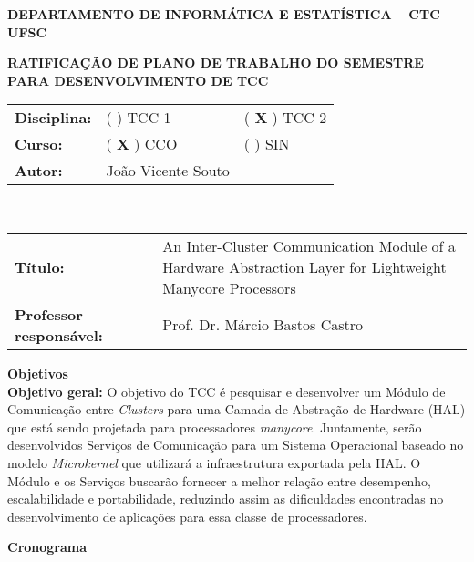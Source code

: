 \documentclass[12pt]{article}
\begin{document}
	\pagestyle{empty}

	\begin{centering}

		\textbf{DEPARTAMENTO DE INFORMÁTICA E ESTATÍSTICA -- CTC -- UFSC}

		\textbf{RATIFICAÇÃO DE PLANO DE TRABALHO DO SEMESTRE \\ PARA DESENVOLVIMENTO DE TCC}

	\end{centering}

	\vspace{1em}
	\setlength\extrarowheight{5pt}
	\begin{tabular}{l l l}
		\textbf{Disciplina:} & ( ) TCC 1          & ( \textbf{X} ) TCC 2 \\
		\textbf{Curso:}      & ( \textbf{X} ) CCO & ( ) SIN              \\
		\textbf{Autor:}      & João Vicente Souto &                      \\
	\end{tabular}
	\vspace{0.5cm}
	\\
	\begin{tabular}{l l}
	\vspace{0.5cm}
		\textbf{Título:} & \makecell{An Inter-Cluster Communication Module of a\\Hardware Abstraction Layer for Lightweight Manycore Processors}\\
		\textbf{Professor responsável:} & Prof. Dr. Márcio Bastos Castro\\
	\end{tabular}


	\vspace{1em}
	{\large \textbf{Objetivos}}
	\\

	\textbf{Objetivo geral:}
	O objetivo do TCC é pesquisar e desenvolver um Módulo de Comunicação entre \textit{Clusters}
	para uma Camada de Abstração de Hardware (HAL) que está sendo projetada para processadores \textit{manycore}.
	Juntamente, serão desenvolvidos Serviços de Comunicação para um Sistema Operacional
	baseado no modelo \textit{Microkernel} que utilizará a infraestrutura exportada pela HAL.
	O Módulo e os Serviços buscarão fornecer a melhor relação entre desempenho, escalabilidade e 
	portabilidade, reduzindo assim as dificuldades encontradas no desenvolvimento
	de aplicações para essa classe de processadores.

	\vspace{1em}
	{\large \textbf{Cronograma}}
\end{document}
